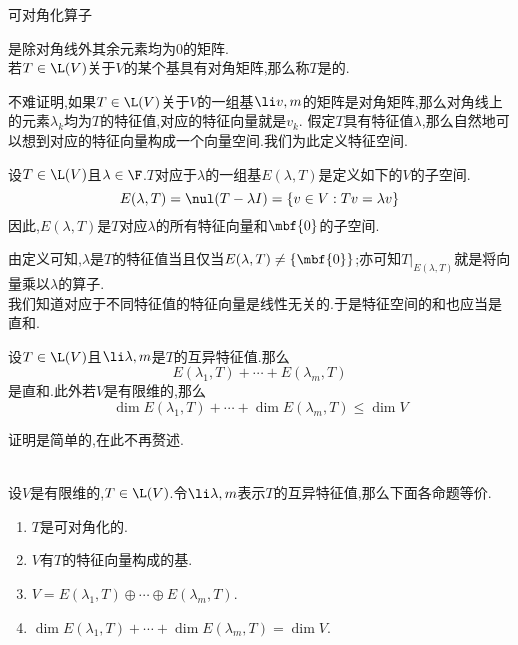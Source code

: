 \documentclass{ctexart}
\begin{document}
\pagestyle{empty}
\begin{center}\large 可对角化算子\end{center}
\begin{definition}[1.1 定义:对角矩阵和可对角化]
    是除对角线外其余元素均为$0$的矩阵.\\
    若$T\in\L(V)$关于$V$的某个基具有对角矩阵,那么称$T$是的.
\end{definition}\noindent
不难证明,如果$T\in\L(V)$关于$V$的一组基$\li v,m$的矩阵是对角矩阵,那么对角线上的元素$\lambda_k$均为$T$的特征值,对应的特征向量就是$v_k$.
假定$T$具有特征值$\lambda$,那么自然地可以想到对应的特征向量构成一个向量空间.我们为此定义特征空间.
\begin{definition}[1.2 定义:特征空间]
    设$T\in\L(V)$且$\lambda\in\F$.$T$对应于$\lambda$的一组基$E(\lambda,T)$是定义如下的$V$的子空间.
    $$E(\lambda,T)=\nul(T-\lambda I)=\left\{v\in V:Tv=\lambda v\right\}$$
    因此,$E(\lambda,T)$是$T$对应$\lambda$的所有特征向量和$\mbf{0}$的子空间.
\end{definition}\noindent
由定义可知,$\lambda$是$T$的特征值当且仅当$E(\lambda,T)\neq\left\{\mbf{0}\right\}$;亦可知$T|_{E(\lambda,T)}$就是将向量乘以$\lambda$的算子.\\
我们知道对应于不同特征值的特征向量是线性无关的.于是特征空间的和也应当是直和.
\begin{formal}[1.3 特征空间之和是直和]
    设$T\in\L(V)$且$\li\lambda,m$是$T$的互异特征值.那么
    $$E(\lambda_1,T)+\cdots+E(\lambda_m,T)$$
    是直和.此外若$V$是有限维的,那么
    $$\dim E(\lambda_1,T)+\cdots+\dim E(\lambda_m,T)\leqslant \dim V$$
\end{formal}\noindent
证明是简单的,在此不再赘述.\\
\\
\begin{formal}[2.1 可对角化的等价条件]
    设$V$是有限维的,$T\in\L(V)$.令$\li\lambda,m$表示$T$的互异特征值,那么下面各命题等价.
    \begin{enumerate}[label=\tbf{(\alph*)}]
        \item $T$是可对角化的.
        \item $V$有$T$的特征向量构成的基.
        \item $V=E(\lambda_1,T)\oplus\cdots\oplus E(\lambda_m,T)$.
        \item $\dim E(\lambda_1,T)+\cdots+\dim E(\lambda_m,T)=\dim V$.
    \end{enumerate}
\end{formal}
\end{document}
